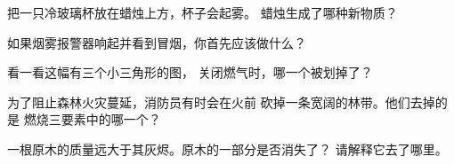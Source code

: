 \begin{exercise}[$\star$]\label{exo:g4:what-a-fire-needs:7}
把一只冷玻璃杯放在蜡烛上方，杯子会起雾。
蜡烛生成了哪种新物质？
\end{exercise}

\begin{exercise}[$\star$]\label{exo:g4:what-a-fire-needs:8}
如果烟雾报警器响起并看到冒烟，你首先应该做什么？
\end{exercise}

\begin{exercise}[$\star$]\label{exo:g4:what-a-fire-needs:9}
看一看这幅有三个小三角形的图，
关闭燃气时，哪一个被划掉了？
\end{exercise}

\begin{exercise}[$\star\star$]\label{exo:g4:what-a-fire-needs:10}
为了阻止森林火灾蔓延，消防员有时会在火前
砍掉一条宽阔的林带。他们去掉的是
燃烧三要素中的哪一个？
\end{exercise}

\begin{exercise}[$\star\star$]\label{exo:g4:what-a-fire-needs:11}
一根原木的质量远大于其灰烬。原木的一部分是否消失了？
请解释它去了哪里。
\end{exercise}
